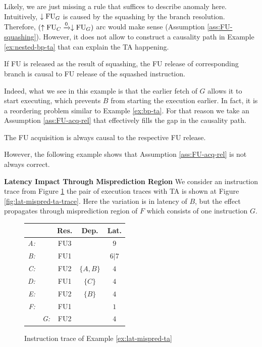Likely, we are just missing a rule that suffices to describe anomaly here. Intuitively, $\downarrow\mathrm{FU}_G$ is caused by the squashing by the branch resolution. Therefore, $(\uparrow\mathrm{FU}_C \xrightarrow{0} \downarrow\mathrm{FU}_G)$ arc would make sense (Assumption \ref{ass:FU-squashing}). However, it does not allow to construct a causality path in Example \ref{ex:nested-bp-ta} that can explain the TA happening. 

\begin{assumption}
If FU is released as the result of squashing, the FU release of corresponding branch is causal to FU release of the squashed instruction.
\label{ass:FU-squashing}
\end{assumption}

Indeed, what we see in this example is that the earlier fetch of $G$ allows it to start executing, which prevents $B$ from starting the execution earlier. In fact, it is a reordering problem similar to Example \ref{ex:bp-ta}. For that reason we take an Assumption \ref{ass:FU-acq-rel} that effectively fills the gap in the causality path.


\begin{assumption}
The FU acquisition is always causal to the respective FU release.
\label{ass:FU-acq-rel}
\end{assumption}

However, the following example shows that Assumption \ref{ass:FU-acq-rel} is not always correct. 

\begin{example}
\textbf{Latency Impact Through Misprediction Region}
We consider an instruction trace from Figure \ref{fig:lat-mispred-ta-input} the pair of execution traces with TA is shown at Figure \ref{fig:lat-mispred-ta-trace}. Here the variation is in latency of $B$, but the effect propagates through misprediction region of $F$ which consists of one instruction $G$. 
\label{ex:lat-mispred-ta}
\end{example}


\begin{figure}[H]
    \centering
    \begin{tabular}{rr|ccc}
    &  & Res. & Dep. & Lat. \\ \hline
    \textit{A:} &  & FU3 &  & $9$ \\
    \textit{B:} &  & FU1 &  & $6|7$ \\
    \textit{C:} &  & FU2 & $\{A, B\}$ & $4$ \\
    \textit{D:} &  & FU1 & $\{C\}$ & $4$ \\
    \textit{E:} &  & FU2 & $\{B\}$ & $4$ \\
    \textit{F:} &  & FU1 &  & $1$ \\
    & \textit{G:} & FU2 &  & $4$ \\
    \end{tabular}
    \caption{Instruction trace of Example \ref{ex:lat-mispred-ta}}
    \label{fig:lat-mispred-ta-input}
\end{figure}


